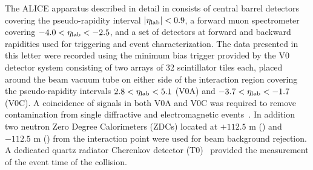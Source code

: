 The ALICE apparatus described in detail in \cite{Aamodt:2008zz} consists of central barrel detectors covering the pseudo-rapidity interval $|\eta_{\rm lab}|<0.9$, a forward muon spectrometer covering $-4.0<\eta_{\rm lab}<-2.5$, and a set of detectors at forward and backward rapidities used for triggering and event characterization. 
The data presented in this letter were recorded using the minimum bias trigger provided by the V0 detector system \cite{Abbas:2013taa} consisting of two arrays of 32 scintillator tiles each, placed around the beam vacuum tube on either side of the interaction region covering the pseudo-rapidity intervals $2.8 < \eta_{\rm lab} < 5.1$ (V0A) and $-3.7 < \eta_{\rm lab} < -1.7$ (V0C). 
A coincidence of signals in both V0A and V0C was required to remove contamination from single diffractive and electromagnetic events~\cite{ALICE:2012xs}. 
In addition two neutron Zero Degree Calorimeters (ZDCs) located at $+112.5$ m (\ZNA) and $-112.5$ m (\ZNC) from the interaction point were used for beam background rejection. %
A dedicated quartz radiator Cherenkov detector (T0)~\cite{Akindinov:2013tea} provided the measurement of the event time of the collision.


